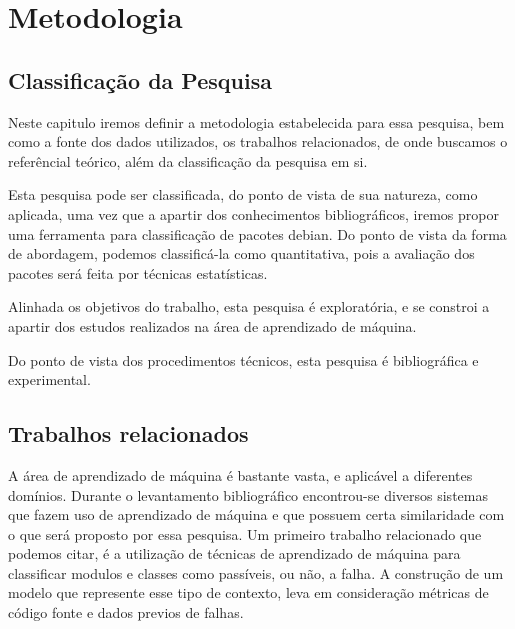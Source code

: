 \chapter{Metodologia}

\section{Classificação da Pesquisa}

Neste capitulo iremos definir a metodologia estabelecida para essa pesquisa, bem como
a fonte dos dados utilizados, os trabalhos relacionados, de onde buscamos o referêncial teórico,
além da classificação da pesquisa em si.

Esta pesquisa pode ser classificada, do ponto de vista de sua natureza, como aplicada, uma vez que a apartir dos conhecimentos bibliográficos,
iremos propor uma ferramenta para classificação de pacotes debian. Do ponto de vista da forma de abordagem, podemos classificá-la como
quantitativa, pois a avaliação dos pacotes será feita por técnicas estatísticas.

Alinhada os objetivos do trabalho, esta pesquisa é exploratória, e se constroi a apartir dos estudos realizados na área de aprendizado
de máquina.

Do ponto de vista dos procedimentos técnicos, esta pesquisa é bibliográfica e experimental.

\section{Trabalhos relacionados}

A área de aprendizado de máquina é bastante vasta, e aplicável a diferentes domínios.
Durante o levantamento bibliográfico encontrou-se diversos sistemas que fazem uso de aprendizado de máquina e que possuem certa similaridade com o que será proposto por essa pesquisa.
Um primeiro trabalho relacionado que podemos citar, é a utilização de técnicas de aprendizado de máquina para classificar modulos e classes como passíveis, ou não, a falha\cite{Malhotra}.
A construção de um modelo que represente esse tipo de contexto, leva em consideração métricas de código fonte e dados previos de falhas\cite{Malhotra}.


